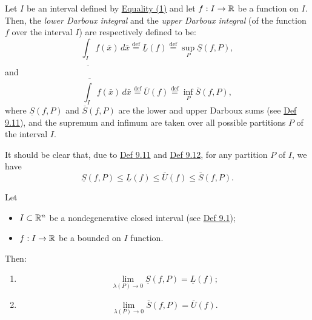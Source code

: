\begin{definition}\label{def:9.12}
Let $I$ be an interval defined by \hyperref[eq:9:1:1]{Equality (1)} and let $f:I\to\mathbb{R}$ be a function on $I$.
Then, the \emph{lower Darboux integral} and the \emph{upper Darboux integral} (of the function $f$ over the interval $I$) are respectively defined to be:
\[
\underline{\int_I}f(\bar x)\,d\bar x
\overset{\mathrm{def}}{=}\underline{L}(f)
\overset{\mathrm{def}}{=}\sup_P\underline{S}(f,P),
\]
and
\[
\overline{\int_I}f(\bar x)\,d\bar x
\overset{\mathrm{def}}{=}\overline{U}(f)
\overset{\mathrm{def}}{=}\inf_P\overline{S}(f,P),
\]
where $\underline{S}(f,P)$ and $\overline{S}(f,P)$ are the lower and upper Darboux sums (see \hyperref[def:9.11]{Def 9.11}), and the supremum and infimum are taken over all possible partitions $P$ of the interval $I$.

It should be clear that, due to \hyperref[def:9.11]{Def 9.11} and \hyperref[def:9.12]{Def 9.12}, for any partition $P$ of $I$, we have
\[
\underline{S}(f,P)\leq\underline{L}(f)\leq\overline{U}(f)\leq\overline{S}(f,P).
\]
\end{definition}

\begin{claim}\label{claim:9.4}
Let
\begin{itemize}
    \item $I\subset\mathbb{R}^n$ be a nondegenerative closed interval (see \hyperref[def:9.1]{Def 9.1});
    \item $f:I\to\mathbb{R}$ be a bounded on $I$ function.
\end{itemize}
Then:
\begin{enumerate}
    \item\label{item:claim:9.4:1}
    \[
    \lim_{\lambda(P)\to0}\underline{S}(f,P)=\underline{L}(f);
    \]
    \item\label{item:claim:9.4:2}
    \[
    \lim_{\lambda(P)\to0}\overline{S}(f,P)=\overline{U}(f).
    \]
\end{enumerate}
\end{claim}

